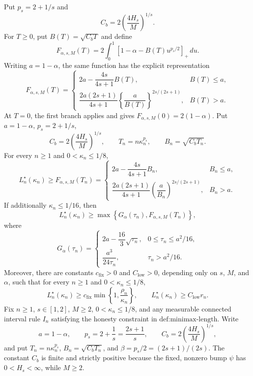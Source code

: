 Put \(p_s=2+1/s\) and
\[
 C_b=2\left(\frac{4H_s}{M}\right)^{1/s}.
\]
For \(T\ge0\), put \(B(T)=\sqrt{C_bT}\) and define
\[
 F_{\alpha,s,M}(T)
 =2\int_0^1\left[1-\alpha-B(T)u^{p_s/2}\right]_+\,du.
\]
Writing \(a=1-\alpha\), the same function has the explicit representation
\[
 F_{\alpha,s,M}(T)
 =\begin{cases}
 2a-\dfrac{4s}{4s+1}B(T),& B(T)\le a,\\[6pt]
 \dfrac{2a(2s+1)}{4s+1}
 \left\{\dfrac{a}{B(T)}\right\}^{2s/(2s+1)},&B(T)>a.
 \end{cases}
\]
At \(T=0\), the first branch applies and gives \(F_{\alpha,s,M}(0)=2(1-\alpha)\).
Put \(a=1-\alpha\), \(p_s=2+1/s\),
\[
 C_b=2\left(\frac{4H_s}{M}\right)^{1/s},
 \qquad T_n=n\kappa_n^{p_s},
 \qquad B_n=\sqrt{C_bT_n}.
\]
For every \(n\ge1\) and \(0<\kappa_n\le1/8\),
\[
 L_n^\star(\kappa_n)\ge F_{\alpha,s,M}(T_n)
 =\begin{cases}
 2a-\dfrac{4s}{4s+1}B_n,&B_n\le a,\\[6pt]
 \dfrac{2a(2s+1)}{4s+1}
 \left(\dfrac{a}{B_n}\right)^{2s/(2s+1)},&B_n>a.
 \end{cases}
\]
If additionally \(\kappa_n\le1/16\), then
\[
 L_n^\star(\kappa_n)
 \ge\max\left\{G_\alpha(\tau_n),F_{\alpha,s,M}(T_n)\right\},
\]
where
\[
 G_\alpha(\tau_n)
 =\begin{cases}
 2a-\dfrac{16}{3}\sqrt{\tau_n},
   &0\le\tau_n\le a^2/16,\\[6pt]
 \dfrac{a^3}{24\tau_n},&\tau_n>a^2/16.
 \end{cases}
\]
Moreover, there are constants \(c_{\mathrm{fix}}>0\) and
\(C_{\mathrm{low}}>0\), depending only on \(s\), \(M\), and
\(\alpha\), such that for every \(n\ge1\) and
\(0<\kappa_n\le1/8\),
\[
 L_n^\star(\kappa_n)
 \ge c_{\mathrm{fix}}\min\left\{1,\frac{\rho_n}{\kappa_n}\right\},
 \qquad
 L_n^\star(\kappa_n)\ge C_{\mathrm{low}}r_n.
\]
Fix \(n\ge1\), \(s\in[1,2]\), \(M\ge2\),
\(0<\kappa_n\le1/8\), and any measurable connected interval rule
\(I_n\) satisfying the honesty constraint in \(\text{def:minimax-length}\).
Write
\[
 a=1-\alpha,
 \qquad p_s=2+\frac1s=\frac{2s+1}{s},
 \qquad C_b=2\left(\frac{4H_s}{M}\right)^{1/s},
\]
and put \(T_n=n\kappa_n^{p_s}\),
\(B_n=\sqrt{C_bT_n}\), and \(\beta=p_s/2=(2s+1)/(2s)\).
The constant \(C_b\) is finite and strictly positive because the fixed,
nonzero bump \(\psi\) has \(0<H_s<\infty\), while \(M\ge2\).

